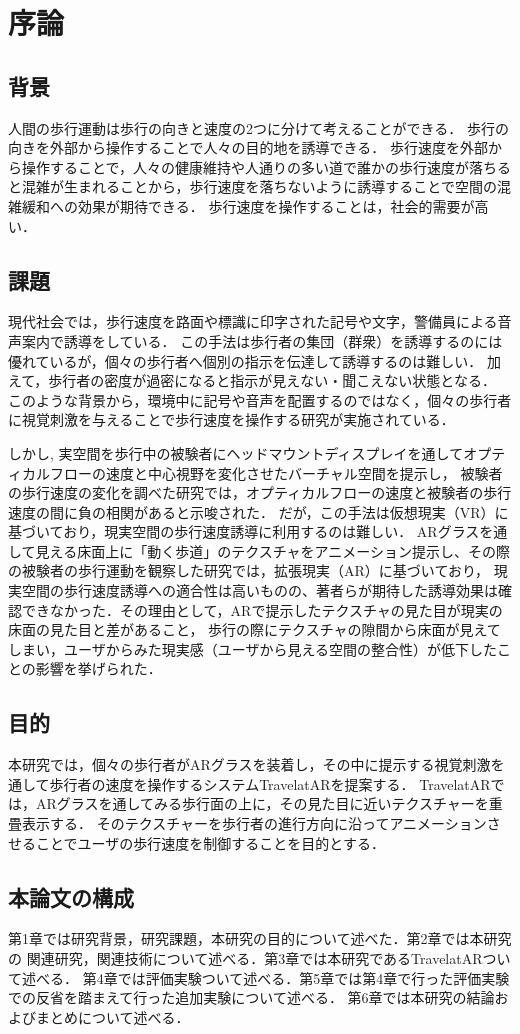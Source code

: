 \chapter{序論}
\section{背景}
人間の歩行運動は歩行の向きと速度の2つに分けて考えることができる．
歩行の向きを外部から操作することで人々の目的地を誘導できる．
歩行速度を外部から操作することで，人々の健康維持や人通りの多い道で誰かの歩行速度が落ちると混雑が生まれることから，歩行速度を落ちないように誘導することで空間の混雑緩和への効果が期待できる．
歩行速度を操作することは，社会的需要が高い．
\section{課題}
現代社会では，歩行速度を路面や標識に印字された記号や文字，警備員による音声案内で誘導をしている\cite{hyosiki}\cite{DJ}．
この手法は歩行者の集団（群衆）を誘導するのには優れているが，個々の歩行者へ個別の指示を伝達して誘導するのは難しい．
加えて，歩行者の密度が過密になると指示が見えない・聞こえない状態となる．
このような背景から，環境中に記号や音声を配置するのではなく，個々の歩行者に視覚刺激を与えることで歩行速度を操作する研究が実施されている．


しかし,
実空間を歩行中の被験者にヘッドマウントディスプレイを通してオプティカルフローの速度と中心視野を変化させたバーチャル空間を提示し，
被験者の歩行速度の変化を調べた研究では，オプティカルフローの速度と被験者の歩行速度の間に負の相関があると示唆された．
だが，この手法は仮想現実（VR）に基づいており，現実空間の歩行速度誘導に利用するのは難しい\cite{VR}\cite{tanizaki}．
ARグラスを通して見える床面上に「動く歩道」のテクスチャをアニメーション提示し、その際の被験者の歩行運動を観察した研究では，拡張現実（AR）に基づいており，
現実空間の歩行速度誘導への適合性は高いものの、著者らが期待した誘導効果は確認できなかった\cite{AR}\cite{sakura}．その理由として，ARで提示したテクスチャの見た目が現実の床面の見た目と差があること，
歩行の際にテクスチャの隙間から床面が見えてしまい，ユーザからみた現実感（ユーザから見える空間の整合性）が低下したことの影響を挙げられた．

\section{目的}
本研究では，個々の歩行者がARグラスを装着し，その中に提示する視覚刺激を通して歩行者の速度を操作するシステムTravelatARを提案する．
TravelatARでは，ARグラスを通してみる歩行面の上に，その見た目に近いテクスチャーを重畳表示する．
そのテクスチャーを歩行者の進行方向に沿ってアニメーションさせることでユーザの歩行速度を制御することを目的とする．
\section{本論文の構成}
第1章では研究背景，研究課題，本研究の目的について述べた．第2章では本研究の
関連研究，関連技術について述べる．第3章では本研究であるTravelatARついて述べる．
第4章では評価実験ついて述べる．第5章では第4章で行った評価実験での反省を踏まえて行った追加実験について述べる．
第6章では本研究の結論およびまとめについて述べる．
